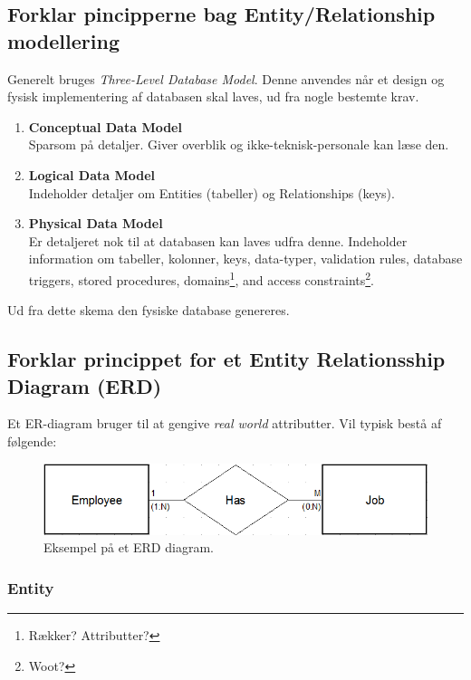 \newpage

\subsection{Forklar pincipperne bag Entity/Relationship modellering}

Generelt bruges \textit{Three-Level Database Model}. Denne anvendes når et design og fysisk implementering af databasen skal laves, ud fra nogle bestemte krav. 

\begin{enumerate}
	\item \textbf{Conceptual Data Model}\\
	Sparsom på detaljer. Giver overblik og ikke-teknisk-personale kan læse den.
	\item \textbf{Logical Data Model}\\
	Indeholder detaljer om Entities (tabeller) og Relationships (keys).
	\item \textbf{Physical Data Model}\\
	Er detaljeret nok til at databasen kan laves udfra denne. Indeholder information om tabeller, kolonner, keys, data-typer, validation rules, database triggers, stored procedures, domains\footnote{Rækker? Attributter?}, and access constraints\footnote{Woot?}.
\end{enumerate}

Ud fra dette skema den fysiske database genereres.

\subsection{Forklar princippet for et Entity Relationsship Diagram (ERD)}

Et ER-diagram bruger til at gengive \textit{real world} attributter. Vil typisk bestå af følgende:\\

\begin{figure}[h]
	\centering
	\includegraphics[width=0.83\linewidth]{figs/spm1/entity_in_relation}
	\caption{Eksempel på et ERD diagram.}
	\label{fig:erd}
\end{figure}

\subsubsection{Entity}

